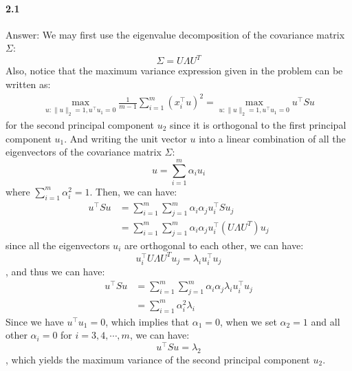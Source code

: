 \documentclass[11pt]{article}
\begin{document}
\paragraph{2.1}
Answer:
\newline
We may first use the eigenvalue decomposition of the covariance matrix $\Sigma$:
\begin{equation}
  \Sigma = U \Lambda U^T
\end{equation}
Also, notice that the maximum variance expression given in the problem can be written as:
\begin{equation}
  \begin{split}
    \max_{u:\| u\|_2=1, u^\top u_1 = 0} \frac{1}{m-1} \sum_{i=1}^m (x_i^\top u)^2 = \max_{u:\| u\|_2=1, u^\top u_1 = 0} u^\top S u
  \end{split}
\end{equation}
for the second principal component $u_2$ since it is orthogonal to the first principal component $u_1$.
And writing the unit vector $u$ into a linear combination of all the eigenvectors of the covariance matrix $\Sigma$:
\begin{equation}
  u = \sum_{i=1}^m \alpha_i u_i
\end{equation}
where $\sum_{i=1}^m \alpha_i^2 = 1$.
Then, we can have:
\begin{equation}
  \begin{split}
    u^\top S u &= \sum_{i=1}^m \sum_{j=1}^m \alpha_i \alpha_j u_i^\top S u_j \\
    &= \sum_{i=1}^m \sum_{j=1}^m \alpha_i \alpha_j u_i^\top (U\Lambda U^T) u_j
  \end{split}
\end{equation} 
since all the eigenvectors $u_i$ are orthogonal to each other, we can have:
\begin{equation}
  u_i^\top U\Lambda U^T u_j = \lambda_i u_i^\top u_j
\end{equation}
, and thus we can have:
\begin{equation}
  \begin{split}
    u^\top S u &= \sum_{i=1}^m \sum_{j=1}^m \alpha_i \alpha_j \lambda_i u_i^\top u_j \\
    &= \sum_{i=1}^m \alpha_i^2 \lambda_i
  \end{split}
\end{equation}
Since we have $u^\top u_1 = 0$, which implies that $\alpha_1=0$, when we set $\alpha_2 = 1$ and all other $\alpha_i = 0$ for $i=3, 4, \cdots, m$, we can have:
\begin{equation}
  u^\top S u = \lambda_2
\end{equation}
, which yields the maximum variance of the second principal component $u_2$.
\end{document}
